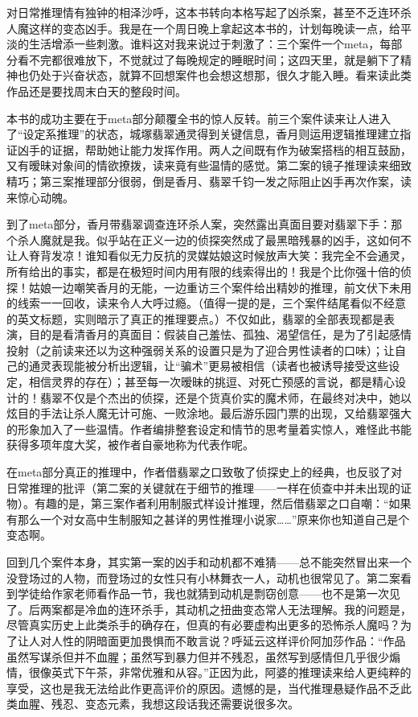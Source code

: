 \par 对日常推理情有独钟的相泽沙呼，这本书转向本格写起了凶杀案，甚至不乏连环杀人魔这样的变态凶手。我是在一个周日晚上拿起这本书的，计划每晚读一点，给平淡的生活增添一些刺激。谁料这对我来说过于刺激了：三个案件一个meta，每部分看不完都很难放下，不觉就过了每晚规定的睡眠时间；这四天里，就是躺下了精神也仍处于兴奋状态，就算不回想案件也会想这想那，很久才能入睡。看来读此类作品还是要找周末白天的整段时间。
\par 本书的成功主要在于meta部分颠覆全书的惊人反转。前三个案件读来让人进入了“设定系推理”的状态，城{塚}翡翠通灵得到关键信息，香月则运用逻辑推理建立指证凶手的证据，帮助她让能力发挥作用。两人之间既有作为破案搭档的相互鼓励，又有暧昧对象间的情欲撩拨，读来竟有些温情的感觉。第二案的镜子推理读来细致精巧；第三案推理部分很弱，倒是香月、翡翠千钧一发之际阻止凶手再次作案，读来惊心动魄。
\par 到了meta部分，香月带翡翠调查连环杀人案，突然露出真面目要对翡翠下手：那个杀人魔就是我。似乎站在正义一边的侦探突然成了最黑暗残暴的凶手，这如何不让人脊背发凉！谁知看似无力反抗的灵媒姑娘这时候放声大笑：我完全不会通灵，所有给出的事实，都是在极短时间内用有限的线索得出的！我是个比你强十倍的侦探！姑娘一边嘲笑香月的无能，一边重访三个案件给出精妙的推理，前文伏下未用的线索一一回收，读来令人大呼过瘾。（值得一提的是，三个案件结尾看似不经意的英文标题，实则暗示了真正的推理要点。）不仅如此，翡翠的全部表现都是表演，目的是看清香月的真面目：假装自己羞怯、孤独、渴望信任，是为了引起感情投射（之前读来还以为这种强弱关系的设置只是为了迎合男性读者的口味）；让自己的通灵表现能被分析出逻辑，让“骗术”更易被相信（读者也被诱导接受这些设定，相信灵界的存在）；甚至每一次暧昧的挑逗、对死亡预感的言说，都是精心设计的！翡翠不仅是个杰出的侦探，还是个货真价实的魔术师，在最终对决中，她以炫目的手法让杀人魔无计可施、一败涂地。最后游乐园门票的出现，又给翡翠强大的形象加入了一些温情。作者编排整套设定和情节的思考量着实惊人，难怪此书能获得多项年度大奖，被作者自豪地称为代表作呢。
\par 在meta部分真正的推理中，作者借翡翠之口致敬了侦探史上的经典，也反驳了对日常推理的批评（第二案的关键就在于细节的推理——一样在侦查中并未出现的证物）。有趣的是，第三案作者利用制服式样设计推理，然后借翡翠之口自嘲：“如果有那么一个对女高中生制服知之甚详的男性推理小说家……”原来你也知道自己是个变态啊。
\par 回到几个案件本身，其实第一案的凶手和动机都不难猜——总不能突然冒出来一个没登场过的人物，而登场过的女性只有小林舞衣一人，动机也很常见了。第二案看到学徒给作家老师看作品一节，我也就猜到动机是剽窃创意——也不是第一次见了。后两案都是冷血的连环杀手，其动机之扭曲变态常人无法理解。我的问题是，尽管真实历史上此类杀手的确存在，但真的有必要虚构出更多的恐怖杀人魔吗？为了让人对人性的阴暗面更加畏惧而不敢言说？呼延云这样评价阿加莎作品：“作品虽然写谋杀但并不血腥；虽然写到暴力但并不残忍，虽然写到感情但几乎很少煽情，很像英式下午茶，非常优雅和从容。”正因为此，阿婆的推理读来给人更纯粹的享受，这也是我无法给此作更高评价的原因。遗憾的是，当代推理悬疑作品不乏此类血腥、残忍、变态元素，我想这段话我还需要说很多次。
\par {}


